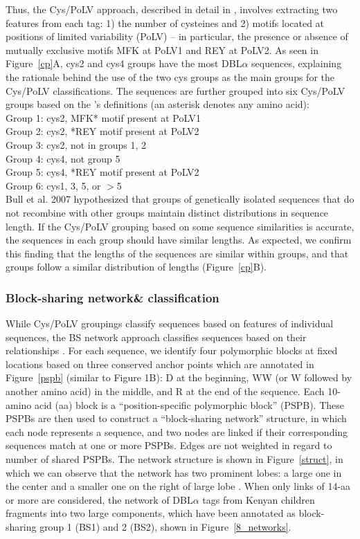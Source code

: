 \documentclass[10pt,twocolumn,superscriptaddress]{revtex4-1}
\newcommand{\dbla}{{DBL$\alpha$}\xspace}
\newcommand{\cp}{{Cys/PoLV}\xspace}
\begin{document}
Thus, the \cp approach, described in detail in \cite{bull2007}, involves extracting two features from each tag: 1) the number of cysteines and 2) motifs located at positions of limited variability (PoLV) -- in particular, the presence or absence of mutually exclusive motifs MFK at PoLV1 and REY at PoLV2. As seen in Figure~\ref{cp}A, cys2 and cys4 groups have the most \dbla sequences, explaining the rationale behind the use of the two cys groups as the main groups for the \cp classifications. The sequences are further grouped into six \cp groups based on the \cite{bull2007}'s definitions (an asterisk denotes any amino acid):  \\

\noindent Group 1: cys2, MFK* motif present at PoLV1  \\
Group 2: cys2, *REY motif present at PoLV2   \\
Group 3: cys2, not in groups 1, 2   \\
Group 4: cys4, not group 5   \\
Group 5: cys4, *REY motif present at PoLV2  \\
Group 6: cys1, 3, 5, or $>$5  \\

Bull et al. 2007 \cite{bull2007} hypothesized that groups of genetically isolated sequences that do not recombine with other groups maintain distinct distributions in sequence length. If the \cp grouping based on some sequence similarities is accurate, the sequences in each group should have similar lengths. As expected, we confirm this finding that the lengths of the sequences are similar within groups, and that groups follow a similar distribution of lengths (Figure~\ref{cp}B).   

\subsubsection{Block-sharing network\& classification}

While \cp groupings classify sequences based on features of individual sequences, the BS network approach classifies sequences based on their relationships \cite{bull2008}. For each sequence, we identify four polymorphic blocks at fixed locations based on three conserved anchor points which are annotated in Figure~\ref{pspb} (similar to \cite{bull2008} Figure 1B): D at the beginning, WW (or W followed by another amino acid) in the middle, and R at the end of the sequence. Each 10-amino acid (aa) block is a ``position-specific polymorphic block'' (PSPB). These PSPBs are then used to construct a ``block-sharing network'' structure, in which each node represents a sequence, and two nodes are linked if their corresponding sequences match at one or more PSPBs. Edges are not weighted in regard to number of shared PSPBs. The network structure is shown in Figure~\ref{struct}, in which we can observe that the network has two prominent lobes: a large one in the center and a smaller one on the right of large lobe \cite{bull2008} \cite{githinji2017}. When only links of 14-aa or more are considered, the network of \dbla tags from Kenyan children \cite{bull2008} fragments into two large components, which have been annotated as block-sharing group 1 (BS1) and 2 (BS2), shown in Figure~\ref{8_networks}.  
\end{document}
